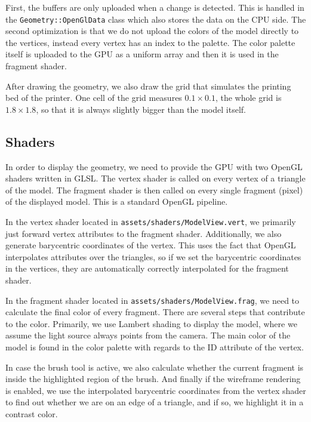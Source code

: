 First, the buffers are only uploaded when a change is detected.
This is handled in the \texttt{Geometry::OpenGlData} class which also stores the data on the CPU side.
The second optimization is that we do not upload the colors of the model directly to the vertices, instead every vertex has an index to the palette.
The color palette itself is uploaded to the GPU as a uniform array and then it is used in the fragment shader.

After drawing the geometry, we also draw the grid that simulates the printing bed of the printer.
One cell of the grid measures $0.1\times{}0.1$, the whole grid is $1.8\times{}1.8$, so that it is always slightly bigger than the model itself.

\subsection{Shaders}

In order to display the geometry, we need to provide the GPU with two OpenGL shaders written in GLSL.
The vertex shader is called on every vertex of a triangle of the model.
The fragment shader is then called on every single fragment (pixel) of the displayed model.
This is a standard OpenGL pipeline.

In the vertex shader located in \texttt{assets/shaders/ModelView.vert}, we primarily just forward vertex attributes to the fragment shader.
Additionally, we also generate barycentric coordinates of the vertex.
This uses the fact that OpenGL interpolates attributes over the triangles, so if we set the barycentric coordinates in the vertices, they are automatically correctly interpolated for the fragment shader.

In the fragment shader located in \texttt{assets/shaders/ModelView.frag}, we need to calculate the final color of every fragment.
There are several steps that contribute to the color.
Primarily, we use Lambert shading to display the model, where we assume the light source always points from the camera.
The main color of the model is found in the color palette with regards to the ID attribute of the vertex.

In case the brush tool is active, we also calculate whether the current fragment is inside the highlighted region of the brush.
And finally if the wireframe rendering is enabled, we use the interpolated barycentric coordinates from the vertex shader to find out whether we are on an edge of a triangle, and if so, we highlight it in a contrast color.

